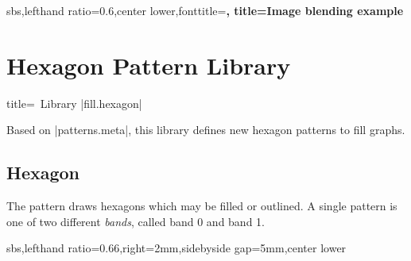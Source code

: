 \documentclass[a4paper,11pt]{article}
\begin{document}
\begin{dispExample*}{sbs,lefthand ratio=0.6,center lower,fonttitle=\bfseries,
  title=Image blending example}
\end{dispExample*}






\clearpage
\section{Hexagon Pattern Library}\label{sec:hexagon}%

\begin{dispListing*}{title=\tikzname\ Library |fill.hexagon|}
\usetikzlibrary{fill.hexagon} %
\usepackage{tikzfill.hexagon} %
\end{dispListing*}

Based on |patterns.meta|, this library defines new hexagon patterns to fill graphs.



\subsection{Hexagon}
The  pattern draws hexagons which may be filled or outlined.
A single pattern is one of two different \emph{bands}, called band 0 and band 1.

\begin{dispExample*}{sbs,lefthand ratio=0.66,right=2mm,sidebyside gap=5mm,center lower}
\end{dispExample*}
\end{document}

